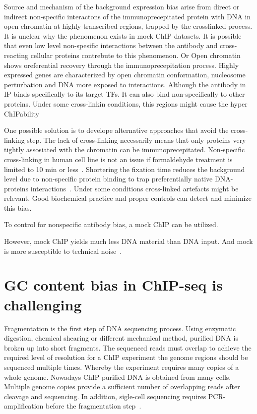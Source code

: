 Source and mechanism of the background expression bias arise from direct or indirect non-specific interactons of the immunoprecepitated protein with DNA in  open chromatin at highly transcribed regions, trapped by the crosslinked process.
It is unclear why the phenomenon exists in mock ChIP datasets.
It is possible that even low level non-spesific interactions between the antibody and cross-reacting cellular proteins contrebute to this phenomenon.
Or Open chromatin shows oreferential recovery through the immunoprecepitation process.
Highly expressed genes are characterized by open chromatin conformation, nucleosome perturbation and DNA more exposed to interactions.\cite{}
Although the antibody in IP binds specifically to its target TFs.
It can also bind non-specifically to other proteins.
Under some cross-linkin conditions, this regions might cause the hyper ChIPability\cite{}

One possible solution is to develope alternative approaches that avoid the cross-linking step.
The lack of cross-linking necessarily means that only proteins very tightly assosiated with the chromatin can be immunoprecepitated.
Non-specific cross-linking in human cell line is not an issue if formaldehyde treatment is limited to 10 min or less~\cite{}.
Shortering the fixation time reduces the background level due to non-specific protein binding to trap preferentially native DNA-proteins interactions~\cite{baranello2016chip}.
Under some conditions cross-linked artefacts might be relevant.
Good biochemical practice and proper controls can detect and minimize this bias.

To control for nonspecific antibody bias, a mock ChIP can be utilized.

However, mock ChIP yields much less DNA material than DNA input.
And mock is more susceptible to technical noise~\cite{kidder2011chip, landt2012chip}.

%
\section{GC content bias in ChIP-seq is challenging}

Fragmentation is the first step of DNA sequencing process.
Using enzymatic digestion, chemical shearing or different mechanical method, purified DNA is broken up into short fragments.
The sequenced reads must overlap to achieve the required level of resolution for a ChIP experiment the genome regions should be sequenced multiple times.
Whereby the experiment requires many copies of a whole genome.
Nowadays ChIP purified DNA is obtained from many cells.
Multiple genome copies provide a sufficient number of overlapping reads after cleavage and sequencing.
In addition, sigle-cell sequencing requires PCR-amplification before the fragmentation step~\cite{clark2016single}.

